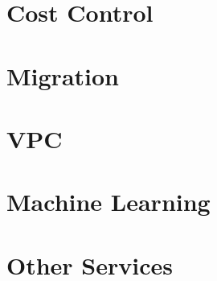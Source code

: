 \documentclass[11pt]{book}
\begin{document}
    \chapter{Cost Control}
    


    \chapter{Migration}
    


    \chapter{VPC}
    


    \chapter{Machine Learning}
    


    \chapter{Other Services}
    

\end{document}
